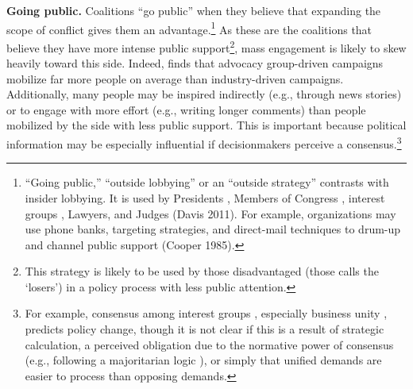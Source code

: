 \textbf{Going public.} Coalitions ``go public'' when they believe that expanding the scope of conflict gives them an advantage.\footnote{
``Going public,'' ``outside lobbying'' or an ``outside strategy'' contrasts with insider lobbying. It is used by Presidents \citep{Kernell2007}, Members of Congress \citep{Malecha2012}, interest groups \citep{Walker1991, Dur2013}, Lawyers, and Judges (Davis 2011). 
For example, organizations may use phone banks, targeting strategies, and direct-mail techniques to drum-up and channel public support (Cooper 1985).
}
As these are the coalitions that believe they have more intense public support\footnote{
This strategy is likely to be used by those disadvantaged (those \citet{Schattschneider1975} calls the `losers') in a policy process with less public attention.
}, mass engagement is likely to skew heavily toward this side. Indeed, \citet{Potter2017} finds that advocacy group-driven campaigns mobilize far more people on average than industry-driven campaigns. Additionally, many people may be inspired indirectly (e.g., through news stories) or to engage with more effort (e.g., writing longer comments) than people mobilized by the side with less public support.  This is important because political information may be especially influential if decisionmakers perceive a consensus.\footnote{
For example, consensus among interest groups \citep{Golden1998, Yackee2006JPART}, especially business unity \citep{Yackee2006JOP, Haeder2015}, predicts policy change, though it is not clear if this is a result of strategic calculation, a perceived obligation due to the normative power of consensus (e.g., following a majoritarian logic \citep{Mendelson2011}), or simply that unified demands are easier to process than opposing demands.
}

